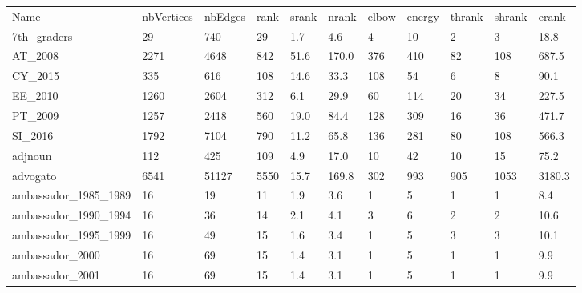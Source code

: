 \begin{longtable}{lllllllllll}
\hline
 Name                                               & nbVertices & nbEdges   & rank  & srank  & nrank  & elbow & energy & thrank & shrank & erank   \\
 7th\_graders                                        & 29         & 740       & 29    & 1.7    & 4.6    & 4     & 10     & 2      & 3      & 18.8    \\
 AT\_2008                                            & 2271       & 4648      & 842   & 51.6   & 170.0  & 376   & 410    & 82     & 108    & 687.5   \\
 CY\_2015                                            & 335        & 616       & 108   & 14.6   & 33.3   & 108   & 54     & 6      & 8      & 90.1    \\
 EE\_2010                                            & 1260       & 2604      & 312   & 6.1    & 29.9   & 60    & 114    & 20     & 34     & 227.5   \\
 PT\_2009                                            & 1257       & 2418      & 560   & 19.0   & 84.4   & 128   & 309    & 16     & 36     & 471.7   \\
 SI\_2016                                            & 1792       & 7104      & 790   & 11.2   & 65.8   & 136   & 281    & 80     & 108    & 566.3   \\
 adjnoun                                            & 112        & 425       & 109   & 4.9    & 17.0   & 10    & 42     & 10     & 15     & 75.2    \\
 advogato                                           & 6541       & 51127     & 5550  & 15.7   & 169.8  & 302   & 993    & 905    & 1053   & 3180.3  \\
 ambassador\_1985\_1989                               & 16         & 19        & 11    & 1.9    & 3.6    & 1     & 5      & 1      & 1      & 8.4     \\
 ambassador\_1990\_1994                               & 16         & 36        & 14    & 2.1    & 4.1    & 3     & 6      & 2      & 2      & 10.6    \\
 ambassador\_1995\_1999                               & 16         & 49        & 15    & 1.6    & 3.4    & 1     & 5      & 3      & 3      & 10.1    \\
 ambassador\_2000                                    & 16         & 69        & 15    & 1.4    & 3.1    & 1     & 5      & 1      & 1      & 9.9     \\
 ambassador\_2001                                    & 16         & 69        & 15    & 1.4    & 3.1    & 1     & 5      & 1      & 1      & 9.9     \\

\end{longtable}
